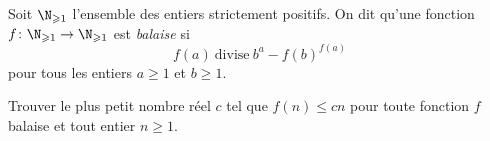 Soit $\N_{\geqslant 1}$ l'ensemble des entiers strictement positifs.
On dit qu'une fonction $f \colon \N_{\geqslant 1} \to \N_{\geqslant 1}$
est \emph{balaise} si
\[
f(a) \ \text{divise} \ b^a - f(b)^{f(a)}
\]
pour tous les entiers $a \geqslant 1$ et $b \geqslant 1$.

Trouver le plus petit nombre réel $c$ tel que $f(n) \leqslant cn$ pour
toute fonction $f$ balaise et tout entier $n \geqslant 1$.
